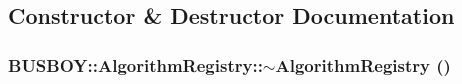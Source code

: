 \subsection{Constructor \& Destructor Documentation}
\hypertarget{classBUSBOY_1_1AlgorithmRegistry_a7d9a6ae87859819ec23f1bbac9e1e7ad}{
\subsubsection[{$\sim$AlgorithmRegistry}]{\setlength{\rightskip}{0pt plus 5cm}BUSBOY::AlgorithmRegistry::$\sim$AlgorithmRegistry ()}}
\label{classBUSBOY_1_1AlgorithmRegistry_a7d9a6ae87859819ec23f1bbac9e1e7ad}


